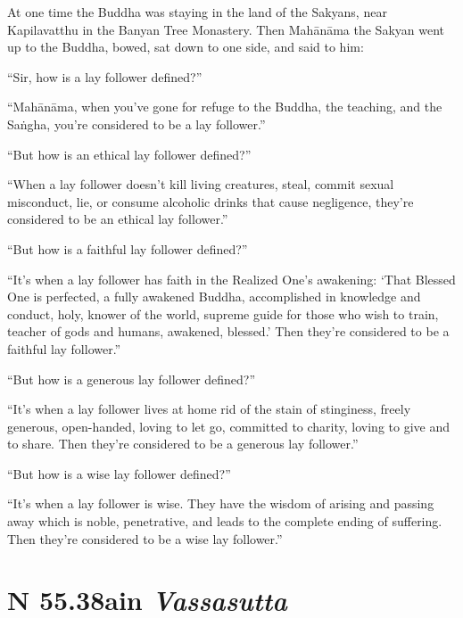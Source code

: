 \documentclass[12pt,openany]{book}%
\newcommand*{\suttatitleacronym}[1]{\smaller[2]{#1}\vspace*{.3em}}
\newcommand*{\suttatitletranslation}[1]{\linebreak{#1}}
\newcommand*{\suttatitleroot}[1]{\linebreak\smaller[2]\itshape{#1}}
\newcommand*{\tocacronym}[1]{\hspace*{-3.3em}{#1}\quad}
\newcommand*{\toctranslation}[1]{#1}
\newcommand*{\tocroot}[1]{(\textit{#1})}
\begin{document}
At one time the Buddha was staying in the land of the Sakyans, near Kapilavatthu in the Banyan Tree Monastery. Then \textsanskrit{Mahānāma} the Sakyan went up to the Buddha, bowed, sat down to one side, and said to him: 

“Sir, how is a lay follower defined?” 

“\textsanskrit{Mahānāma}, when you’ve gone for refuge to the Buddha, the teaching, and the \textsanskrit{Saṅgha}, you’re considered to be a lay follower.” 

“But how is an ethical lay follower defined?” 

“When a lay follower doesn’t kill living creatures, steal, commit sexual misconduct, lie, or consume alcoholic drinks that cause negligence, they’re considered to be an ethical lay follower.” 

“But how is a faithful lay follower defined?” 

“It’s when a lay follower has faith in the Realized One’s awakening: ‘That Blessed One is perfected, a fully awakened Buddha, accomplished in knowledge and conduct, holy, knower of the world, supreme guide for those who wish to train, teacher of gods and humans, awakened, blessed.’ Then they’re considered to be a faithful lay follower.” 

“But how is a generous lay follower defined?” 

“It’s when a lay follower lives at home rid of the stain of stinginess, freely generous, open-handed, loving to let go, committed to charity, loving to give and to share. Then they’re considered to be a generous lay follower.” 

“But how is a wise lay follower defined?” 

“It’s when a lay follower is wise. They have the wisdom of arising and passing away which is noble, penetrative, and leads to the complete ending of suffering. Then they’re considered to be a wise lay follower.” 

%
\section*{{\suttatitleacronym SN 55.38}{\suttatitletranslation Rain }{\suttatitleroot Vassasutta}}
\addcontentsline{toc}{section}{\tocacronym{SN 55.38} \toctranslation{Rain } \tocroot{Vassasutta}}
\end{document}
